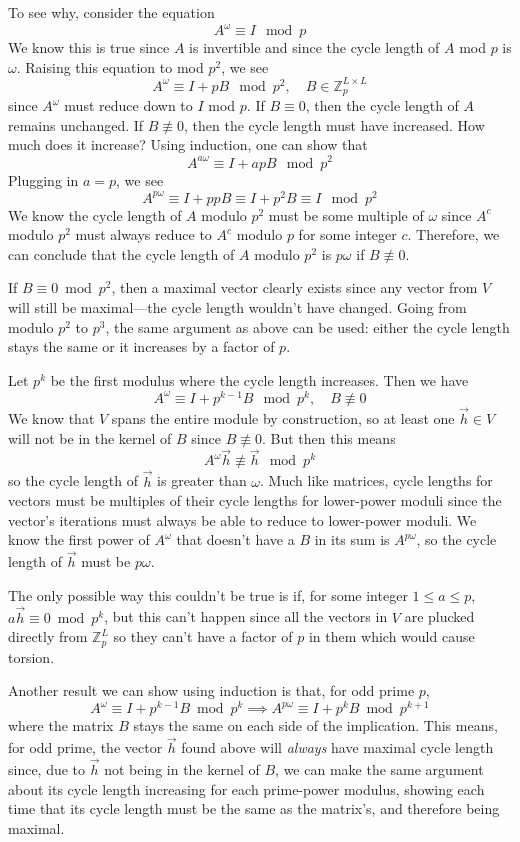 \documentclass[a4paper, reqno, 12pt]{amsart}
\begin{document}
		To see why, consider the equation
		\[
			A^\omega \equiv I \mod{p}
		\]
		We know this is true since $A$ is invertible and since the cycle length of $A$ mod $p$ is $\omega$. Raising this equation to mod $p^2$, we see
		\[
			A^\omega \equiv I + pB \mod{p^2}, \quad B \in \mathds{Z}_p^{L \times L}
		\]
		since $A^\omega$ must reduce down to $I$ mod $p$. If $B \equiv 0$, then the cycle length of $A$ remains unchanged. If $B \not\equiv 0$, then the cycle 
		length must have increased. How much does it increase? Using induction, one can show that
		\[
			A^{a\omega} \equiv I + apB \mod{p^2}
		\]
		Plugging in $a = p$, we see
		\[
			A^{p\omega} \equiv I + ppB \equiv I + p^2B \equiv I \mod{p^2}
		\]
		We know the cycle length of $A$ modulo $p^2$ must be some multiple of $\omega$ since $A^c$ modulo $p^2$ must always reduce to $A^c$ modulo $p$ for
		some integer $c$. Therefore, we can conclude that the cycle length of $A$ modulo $p^2$ is $p\omega$ if $B \not\equiv 0$.
		
		If $B \equiv 0 \bmod{p^2}$, then a maximal vector clearly exists since any vector from $V$ will still be maximal---the cycle length
		wouldn't have changed. Going from modulo $p^2$ to $p^3$, the same argument as above can be used: either the cycle length stays the same or it increases by
		a factor of $p$. 
		
		Let $p^k$ be the first modulus where the cycle length increases. Then we have
		\[
			A^\omega \equiv I + p^{k-1}B \mod{p^k}, \quad B \not\equiv 0
		\]
		We know that $V$ spans the entire module by construction, so at least one $\vec{h} \in V$ will not be in the kernel of $B$ since $B \not\equiv 0$. 
		But then this means
		\[
			A^{\omega}\vec{h} \not\equiv \vec{h} \mod{p^k}
		\]
		so the cycle length of $\vec{h}$ is greater than $\omega$. Much like matrices, cycle lengths for vectors must be multiples of their cycle lengths for
		lower-power moduli since the vector's iterations must always be able to reduce to lower-power moduli. We know the first power of $A^\omega$ that doesn't have 
		a $B$ in its sum is $A^{p\omega}$, so the cycle length of $\vec{h}$ must be $p\omega$. 
		
		The only possible way this couldn't be true is if, for some integer $1 \leq a \leq p$, $a\vec{h} \equiv 0 \bmod{p^k}$, but this can't happen since all the 
		vectors in $V$ are plucked directly from $\mathds{Z}_p^L$ so they can't have a factor of $p$ in them which would cause torsion.
		
		Another result we can show using induction is that, for odd prime $p$,
		\[
			A^{\omega} \equiv I + p^{k-1}B \bmod{p^k} \implies A^{p\omega} \equiv I + p^{k}B \bmod{p^{k+1}}
		\]
		where the matrix $B$ stays the same on each side of the implication. This means, for odd prime, the vector $\vec{h}$ found above will \emph{always} have
		maximal cycle length since, due to $\vec{h}$ not being in the kernel of $B$, we can make the same argument about its cycle length increasing for each
		prime-power modulus, showing each time that its cycle length must be the same as the matrix's, and therefore being maximal.
		
	
	
\end{document}
